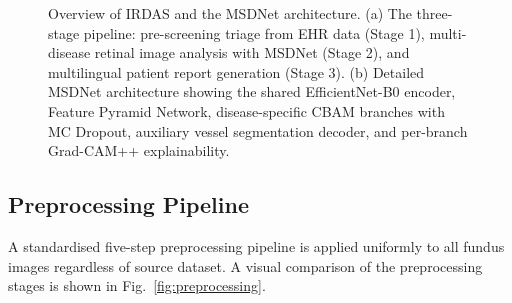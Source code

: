 \documentclass[review,12pt]{elsarticle}
\begin{document}
\begin{figure}[htbp]
  \centering
  \caption{Overview of IRDAS and the MSDNet architecture. (a) The three-stage
  pipeline: pre-screening triage from EHR data (Stage 1), multi-disease retinal
  image analysis with MSDNet (Stage 2), and multilingual patient report
  generation (Stage 3). (b) Detailed MSDNet architecture showing the shared
  EfficientNet-B0 encoder, Feature Pyramid Network, disease-specific CBAM
  branches with MC Dropout, auxiliary vessel segmentation decoder, and
  per-branch Grad-CAM++ explainability.}
  \label{fig:overview}
\end{figure}

\subsection{Preprocessing Pipeline}

A standardised five-step preprocessing pipeline is applied uniformly to all
fundus images regardless of source dataset. A visual comparison of the
preprocessing stages is shown in Fig.~\ref{fig:preprocessing}.
\end{document}
